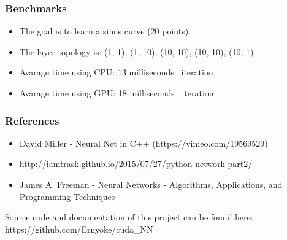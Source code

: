 \documentclass{beamer}
\begin{document}
\begin{frame}
\frametitle{Benchmarks}
\begin{itemize}
\item The goal is to learn a sinus curve (20 points).
\item The layer topology is: (1, 1), (1, 10), (10, 10), (10, 10), (10, 1)
\item Avarage time using CPU: 13 milliseconds \ iteration
\item Avarage time using GPU: 18 milliseconds \ iteration
 
\end{itemize}
\end{frame}

\begin{frame}
\frametitle{References}
\begin{itemize}
\item  David Miller - Neural Net in C++ (https://vimeo.com/19569529)
\item  http://iamtrask.github.io/2015/07/27/python-network-part2/
\item  James A. Freeman - Neural Networks - Algorithms, Applications, and Programming Techniques
\end{itemize}
\vspace{1cm}
\centering
Source code and documentation of this project can be found here: https://github.com/Ernyoke/cuda_NN
\end{frame}
\end{document}
